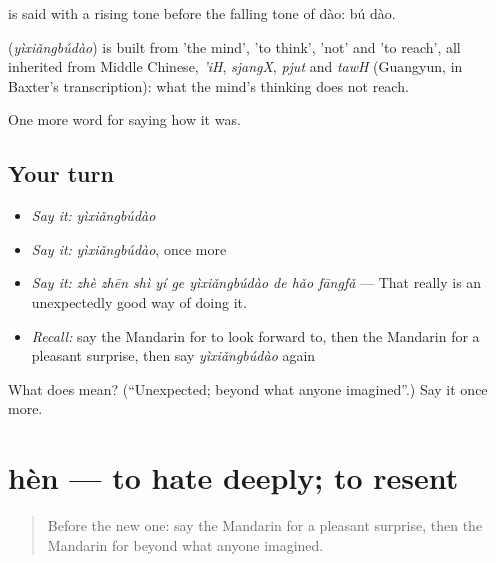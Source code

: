  is said with a rising tone before the falling tone of dào: bú dào.

\begin{cousinweb}
\textbf{} (\emph{yìxiǎngbúdào}) is built from  'the mind',  'to think',  'not' and  'to reach', all inherited from Middle Chinese, \emph{'iH}, \emph{sjangX}, \emph{pjut} and \emph{tawH} (Guangyun, in Baxter's transcription): what the mind's thinking does not reach.
\end{cousinweb}

\begin{grammarlens}[title={What you've built}]
One more word for saying how it was.
\end{grammarlens}

\subsection*{Your turn}
\begin{itemize}
\raggedright
  \item \emph{Say it:} \emph{yìxiǎngbúdào}
  \item \emph{Say it:} \emph{yìxiǎngbúdào}, once more
  \item \emph{Say it:} \emph{zhè zhēn shì yí ge yìxiǎngbúdào de hǎo fāngfǎ} — That really is an unexpectedly good way of doing it.
  \item \emph{Recall:} say the Mandarin for to look forward to, then the Mandarin for a pleasant surprise, then say \emph{yìxiǎngbúdào} again
\end{itemize}

\begin{tcolorbox}[breakable,colback=teal!4,colframe=teal!35!black,title={Before you move on}]
What does  mean? (\textquotedblleft{}Unexpected; beyond what anyone imagined\textquotedblright{}.) Say it once more.
\end{tcolorbox}
\section[hèn]{hèn — to hate deeply; to resent}

\label{lesson:ZH-C462-hen}



\begin{quote}
Before the new one: say the Mandarin for a pleasant surprise, then the Mandarin for beyond what anyone imagined.
\end{quote}

